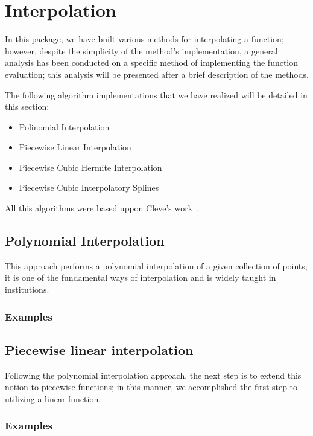 \section{Interpolation}
In this package, we have built various methods for interpolating a function; however, despite the simplicity of the method's implementation, a general analysis has been conducted on a specific method of implementing the function evaluation; this analysis will be presented after a brief description of the methods.

The following algorithm implementations that we have realized will be detailed in this section:
\begin{itemize}
    \item Polinomial Interpolation 
    \item Piecewise Linear Interpolation 
    \item Piecewise Cubic Hermite Interpolation 
    \item Piecewise Cubic Interpolatory Splines 
\end{itemize}

All this algorithms were based uppon Cleve's work~\cite{doi:10.1137/1.9780898717952}.
\subsection{Polynomial Interpolation}
This approach performs a polynomial interpolation of a given collection of points; it is one of the fundamental ways of interpolation and is widely taught in institutions.
\subsubsection{Examples}
	


\subsection{Piecewise linear interpolation}
Following the polynomial interpolation approach, the next step is to extend this notion to piecewise functions; in this manner, we accomplished the first step to utilizing a linear function.
\subsubsection{Examples}
	

